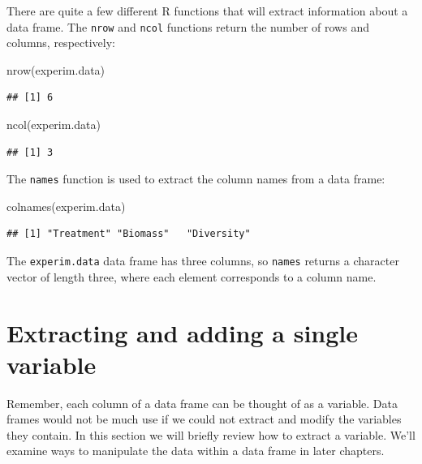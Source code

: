 \documentclass[
]{book}
\newenvironment{Shaded}{\begin{snugshade}}{\end{snugshade}}
\newcommand{\FunctionTok}[1]{\textcolor[rgb]{0.00,0.00,0.00}{#1}}
\newcommand{\NormalTok}[1]{#1}
\begin{document}
There are quite a few different R functions that will extract information about a data frame. The \texttt{nrow} and \texttt{ncol} functions return the number of rows and columns, respectively:

\begin{Shaded}
\begin{Highlighting}[]
\FunctionTok{nrow}\NormalTok{(experim.data)}
\end{Highlighting}
\end{Shaded}

\begin{verbatim}
## [1] 6
\end{verbatim}

\begin{Shaded}
\begin{Highlighting}[]
\FunctionTok{ncol}\NormalTok{(experim.data)}
\end{Highlighting}
\end{Shaded}

\begin{verbatim}
## [1] 3
\end{verbatim}

The \texttt{names} function is used to extract the column names from a data frame:

\begin{Shaded}
\begin{Highlighting}[]
\FunctionTok{colnames}\NormalTok{(experim.data)}
\end{Highlighting}
\end{Shaded}

\begin{verbatim}
## [1] "Treatment" "Biomass"   "Diversity"
\end{verbatim}

The \texttt{experim.data} data frame has three columns, so \texttt{names} returns a character vector of length three, where each element corresponds to a column name.

\hypertarget{extracting-and-adding-a-single-variable}{%
\section{Extracting and adding a single variable}\label{extracting-and-adding-a-single-variable}}

Remember, each column of a data frame can be thought of as a variable. Data frames would not be much use if we could not extract and modify the variables they contain. In this section we will briefly review how to extract a variable. We'll examine ways to manipulate the data within a data frame in later chapters.
\end{document}
